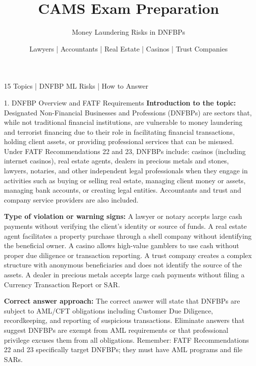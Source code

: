 \documentclass[11pt,a4paper]{beamer}
\title[CAMS Exam Preparation]{CAMS Exam Preparation}
\subtitle{Money Laundering Risks in DNFBPs}
\author{Lawyers | Accountants | Real Estate | Casinos | Trust Companies}
\date{}
\begin{document}
\begin{frame}
\titlepage
\centering
\tiny 15 Topics | DNFBP ML Risks | How to Answer
\end{frame}

\begin{frame}{1. DNFBP Overview and FATF Requirements}
\tiny
\noindent\textbf{Introduction to the topic:} Designated Non-Financial Businesses and Professions (DNFBPs) are sectors that, while not traditional financial institutions, are vulnerable to money laundering and terrorist financing due to their role in facilitating financial transactions, holding client assets, or providing professional services that can be misused. Under FATF Recommendations 22 and 23, DNFBPs include: casinos (including internet casinos), real estate agents, dealers in precious metals and stones, lawyers, notaries, and other independent legal professionals when they engage in activities such as buying or selling real estate, managing client money or assets, managing bank accounts, or creating legal entities. Accountants and trust and company service providers are also included.

\vspace{0.1cm}
\noindent\textbf{Type of violation or warning signs:} A lawyer or notary accepts large cash payments without verifying the client's identity or source of funds. A real estate agent facilitates a property purchase through a shell company without identifying the beneficial owner. A casino allows high-value gamblers to use cash without proper due diligence or transaction reporting. A trust company creates a complex structure with anonymous beneficiaries and does not identify the source of the assets. A dealer in precious metals accepts large cash payments without filing a Currency Transaction Report or SAR.

\vspace{0.1cm}
\noindent\textbf{Correct answer approach:} The correct answer will state that DNFBPs are subject to AML/CFT obligations including Customer Due Diligence, recordkeeping, and reporting of suspicious transactions. Eliminate answers that suggest DNFBPs are exempt from AML requirements or that professional privilege excuses them from all obligations. Remember: FATF Recommendations 22 and 23 specifically target DNFBPs; they must have AML programs and file SARs.
\end{frame}
\end{document}
